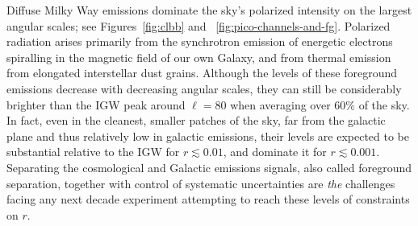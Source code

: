 \documentclass[PICOReport.tex]{subfiles}
\begin{document}

Diffuse Milky Way emissions dominate the sky's polarized intensity on the largest angular scales; see Figures~\ref{fig:clbb} and ~\ref{fig:pico-channels-and-fg}. Polarized radiation arises primarily from the synchrotron emission of energetic electrons spiralling in the magnetic field of our own Galaxy, and from thermal
emission from elongated interstellar dust grains. Although the levels of these foreground emissions decrease with decreasing angular scales, they can still be considerably brighter 
than the \ac{IGW} peak around $\ell=80$ when averaging over 60\% of the sky. 
In fact, even in the cleanest, smaller patches of the sky, far from the galactic plane and thus relatively low in galactic emissions, their levels are expected to be substantial relative to the \ac{IGW} for $r \lesssim 0.01$, and dominate it for $r \lesssim0.001$. Separating the cosmological and Galactic emissions signals, also called foreground separation, together with control of systematic uncertainties are {\it the} challenges facing any next decade experiment attempting to reach these levels of constraints on $r$.
\end{document}
